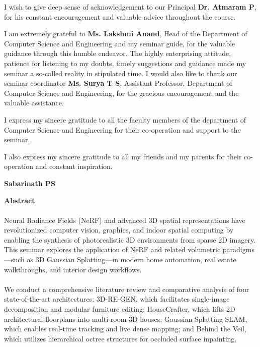 \documentclass[12pt,a4paper,final]{extreport}
\begin{document}
I wish to give deep sense of acknowledgement to our Principal \textbf{Dr. Atmaram P}, for his constant encouragement and valuable advice throughout the course.

I am extremely grateful to \textbf{Ms. Lakshmi Anand}, Head of the Department of Computer Science and Engineering and my seminar guide, for the valuable guidance through this humble endeavor. The highly enterprising attitude, patience for listening to my doubts, timely suggestions and guidance made my seminar a so-called reality in stipulated time.
I would also like to thank our seminar coordinator \textbf{Ms. Surya T S}, Assistant Professor, Department of Computer Science and Engineering, for the gracious encouragement and the valuable assistance.

I express my sincere gratitude to all the faculty members of the department of Computer Science and Engineering for their co-operation and support to the seminar.

I also express my sincere gratitude to all my friends and my parents for their co-operation and constant inspiration.

\vspace{2cm}
\noindent\hfill
\begin{minipage}[t]{0.4\textwidth}
\centering
\textbf{Sabarinath PS}
\end{minipage}

\newpage

\begin{center}
\begin{huge}
\textbf{Abstract}
\end{huge}
\end{center}

\vskip0.3cm

\begingroup
\paragraph{} Neural Radiance Fields (NeRF) and advanced 3D spatial representations have revolutionized computer vision, graphics, and indoor spatial computing by enabling the synthesis of photorealistic 3D environments from sparse 2D imagery. This seminar explores the application of NeRF and related volumetric paradigms---such as 3D Gaussian Splatting---in modern home automation, real estate walkthroughs, and interior design workflows.

\paragraph{} We conduct a comprehensive literature review and comparative analysis of four state-of-the-art architectures: 3D-RE-GEN, which facilitates single-image decomposition and modular furniture editing; HouseCrafter, which lifts 2D architectural floorplans into multi-room 3D houses; Gaussian Splatting SLAM, which enables real-time tracking and live dense mapping; and Behind the Veil, which utilizes hierarchical octree structures for occluded surface inpainting.
\end{document}
